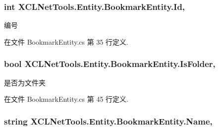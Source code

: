\hypertarget{class_x_c_l_net_tools_1_1_entity_1_1_bookmark_entity_a827314c81aad0801f464f7359509baec}{
\subsubsection[{Id}]{\setlength{\rightskip}{0pt plus 5cm}int X\-C\-L\-Net\-Tools.\-Entity.\-Bookmark\-Entity.\-Id\hspace{0.3cm}{\ttfamily [get]}, {\ttfamily [set]}}}\label{class_x_c_l_net_tools_1_1_entity_1_1_bookmark_entity_a827314c81aad0801f464f7359509baec}


编号 



在文件 Bookmark\-Entity.\-cs 第 35 行定义.

\hypertarget{class_x_c_l_net_tools_1_1_entity_1_1_bookmark_entity_a025f1606c5b38103058567b3e08afe03}{
\subsubsection[{Is\-Folder}]{\setlength{\rightskip}{0pt plus 5cm}bool X\-C\-L\-Net\-Tools.\-Entity.\-Bookmark\-Entity.\-Is\-Folder\hspace{0.3cm}{\ttfamily [get]}, {\ttfamily [set]}}}\label{class_x_c_l_net_tools_1_1_entity_1_1_bookmark_entity_a025f1606c5b38103058567b3e08afe03}


是否为文件夹 



在文件 Bookmark\-Entity.\-cs 第 45 行定义.

\hypertarget{class_x_c_l_net_tools_1_1_entity_1_1_bookmark_entity_a89ccb517e285bfdd17981a72f590bc1c}{
\subsubsection[{Name}]{\setlength{\rightskip}{0pt plus 5cm}string X\-C\-L\-Net\-Tools.\-Entity.\-Bookmark\-Entity.\-Name\hspace{0.3cm}{\ttfamily [get]}, {\ttfamily [set]}}}\label{class_x_c_l_net_tools_1_1_entity_1_1_bookmark_entity_a89ccb517e285bfdd17981a72f590bc1c}


